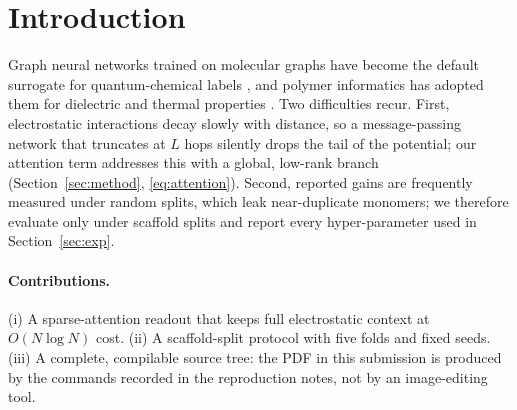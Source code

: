 \section{Introduction}
\label{sec:intro}

Graph neural networks trained on molecular graphs have become the default
surrogate for quantum-chemical labels \citep{zhang2022gnn}, and polymer
informatics has adopted them for dielectric and thermal properties
\citep{liu2021polymer}. Two difficulties recur. First, electrostatic
interactions decay slowly with distance, so a message-passing network that
truncates at $L$ hops silently drops the tail of the potential; our attention
term addresses this with a global, low-rank branch (Section~\ref{sec:method},
\eqref{eq:attention}). Second, reported gains are frequently measured under random
splits, which leak near-duplicate monomers; we therefore evaluate only under
scaffold splits \citep{wang2020scaffold} and report every hyper-parameter used
in Section~\ref{sec:exp}.

\paragraph{Contributions.}
(i) A sparse-attention readout that keeps full electrostatic context at
$O(N\log N)$ cost. (ii) A scaffold-split protocol with five folds and fixed
seeds. (iii) A complete, compilable source tree: the PDF in this submission is
produced by the commands recorded in the reproduction notes, not by an
image-editing tool.
